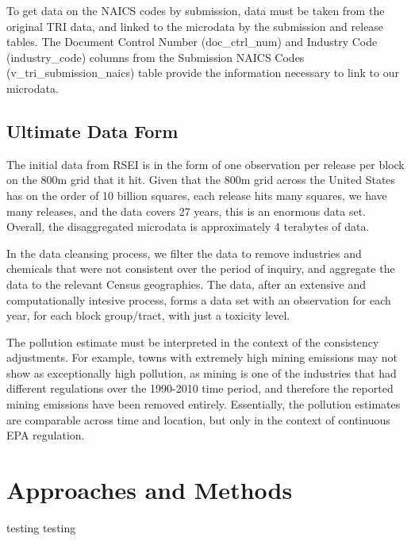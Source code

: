 \documentclass[12pt,twoside]{dukestatscithesis}
\theoremstyle{definition}
\theoremstyle{definition}
\theoremstyle{definition}
\theoremstyle{remark}
\begin{document}
To get data on the NAICS codes by submission, data must be taken from
the original TRI data, and linked to the microdata by the submission and
release tables. The Document Control Number (doc\_ctrl\_num) and
Industry Code (industry\_code) columns from the Submission NAICS Codes
(v\_tri\_submission\_naics) table provide the information necessary to
link to our microdata.

\section{Ultimate Data Form}\label{ultimate-data-form}

The initial data from RSEI is in the form of one observation per release
per block on the 800m grid that it hit. Given that the 800m grid across
the United States has on the order of 10 billion squares, each release
hits many squares, we have many releases, and the data covers 27 years,
this is an enormous data set. Overall, the disaggregated microdata is
approximately 4 terabytes of data.

In the data cleansing process, we filter the data to remove industries
and chemicals that were not consistent over the period of inquiry, and
aggregate the data to the relevant Census geographies. The data, after
an extensive and computationally intesive process, forms a data set with
an observation for each year, for each block group/tract, with just a
toxicity level.

The pollution estimate must be interpreted in the context of the
consistency adjustments. For example, towns with extremely high mining
emissions may not show as exceptionally high pollution, as mining is one
of the industries that had different regulations over the 1990-2010 time
period, and therefore the reported mining emissions have been removed
entirely. Essentially, the pollution estimates are comparable across
time and location, but only in the context of continuous EPA regulation.

\chapter{Approaches and Methods}\label{ref-labels}
\begin{Shaded}
\begin{Highlighting}[]
\end{Highlighting}
\end{Shaded}
testing testing
\end{document}
